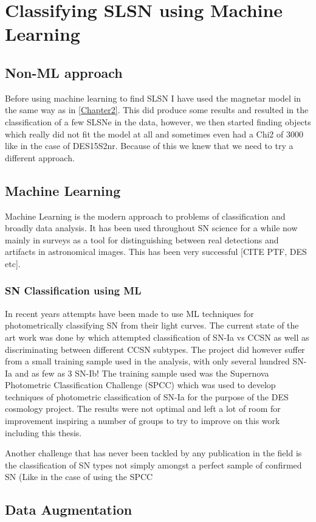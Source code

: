 
\chapter{Classifying SLSN using Machine Learning} %
\label{Chapter5}

\section{Non-ML approach}
Before using machine learning to find SLSN I have used the magnetar model in the same way as in \cref{Chapter2}. This did produce some results and resulted in the classification of a few SLSNe in the data, however, we then started finding objects which really did not fit the model at all and sometimes even had a Chi2 of 3000 like in the case of DES15S2nr. Because of this we knew that we need to try a different approach. 

\section{Machine Learning}
Machine Learning is the modern approach to problems of classification and broadly data analysis. It has been used throughout SN science for a while now mainly in surveys as a tool for distinguishing between real detections and artifacts in astronomical images. This has been very successful [CITE PTF, DES etc]. 

\subsection{SN Classification using ML}
In recent years attempts have been made to use ML techniques for photometrically classifying SN from their light curves. The current state of the art work was done by \citet{Lochner2016PHOTOMETRICLEARNING} which attempted classification of SN-Ia vs CCSN as well as discriminating between different CCSN subtypes. The project did however suffer from a small training sample used in the analysis, with only several hundred SN-Ia and as few as 3 SN-Ib! The training sample used was the Supernova Photometric Classification Challenge (SPCC) \citep{Kessler2010} which was used to develop techniques of photometric classification of SN-Ia for the purpose of the DES cosmology project. The results were not optimal and left a lot of room for improvement inspiring a number of groups to try to improve on this work including this thesis.

Another challenge that has never been tackled by any publication in the field is the classification of SN types not simply amongst a perfect sample of confirmed SN (Like in the case of using the SPCC

\section{Data Augmentation}

